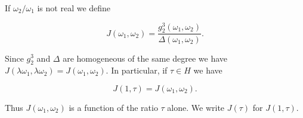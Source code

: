 If $\omega_2/\omega_1$ is not real we define

$$J(\omega_1, \omega_2) = \frac{g_2^3(\omega_1, \omega_2)}{\Delta(\omega_1, \omega_2)}.$$

Since $g_2^3$ and $\Delta$ are homogeneous of the same degree we have $J(\lambda \omega_1, \lambda \omega_2) = J(\omega_1, \omega_2)$. In particular, if $\tau \in H$ we have

$$J(1, \tau) = J(\omega_1, \omega_2).$$

Thus $J(\omega_1, \omega_2)$ is a function of the ratio $\tau$ alone. We write $J(\tau)$ for $J(1, \tau)$.
